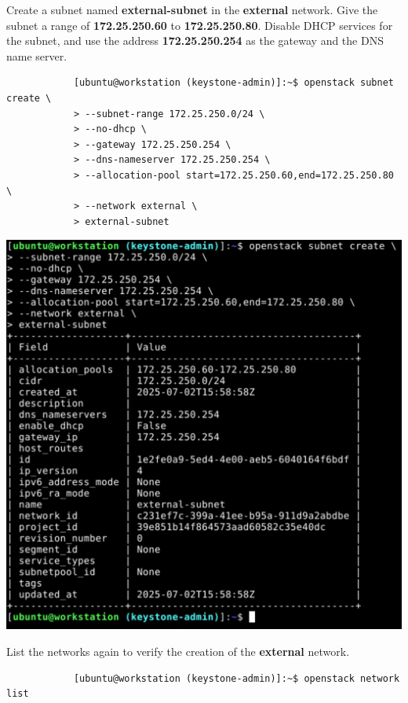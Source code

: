 \documentclass[letterpaper, 12pt]{article}
\begin{document}
\begin{enumerate}
    \begin{labstep}
        Create a subnet named \textbf{external-subnet} in the \textbf{external} network.
        Give the subnet a range of \textbf{172.25.250.60} to \textbf{172.25.250.80}.
        Disable DHCP services for the subnet, and use the address \textbf{172.25.250.254} as the gateway and the DNS name server.
        \begin{lstlisting}
            [ubuntu@workstation (keystone-admin)]:~$ openstack subnet create \
            > --subnet-range 172.25.250.0/24 \
            > --no-dhcp \
            > --gateway 172.25.250.254 \
            > --dns-nameserver 172.25.250.254 \
            > --allocation-pool start=172.25.250.60,end=172.25.250.80 \
            > --network external \
            > external-subnet
        \end{lstlisting}

        \begin{center}
            \includegraphics[width=\linewidth]{images/part9/step11.png}
        \end{center}
    \end{labstep}

    \begin{labstep}
        List the networks again to verify the creation of the \textbf{external} network.
        \begin{lstlisting}
            [ubuntu@workstation (keystone-admin)]:~$ openstack network list
        \end{lstlisting}


\end{labstep}
\end{enumerate}
\end{document}
